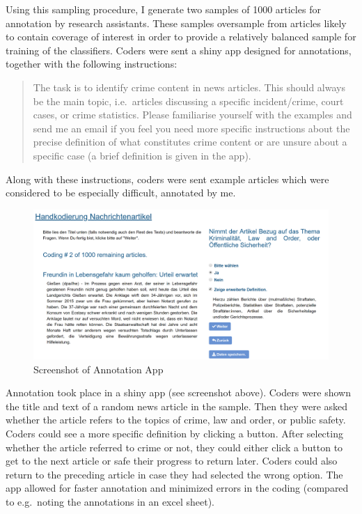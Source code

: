\documentclass[
]{article}
\begin{document}
Using this sampling procedure, I generate two samples of 1000 articles for annotation by research assistants. These samples oversample from articles likely to contain coverage of interest in order to provide a relatively balanced sample for training of the classifiers. Coders were sent a shiny app designed for annotations, together with the following instructions:

\begin{quote}
The task is to identify crime content in news articles. This should always be the main topic, i.e.~articles discussing a specific incident/crime, court cases, or crime statistics. Please familiarise yourself with the examples and send me an email if you feel you need more specific instructions about the precise definition of what constitutes crime content or are unsure about a specific case (a brief definition is given in the app).
\end{quote}

Along with these instructions, coders were sent example articles which were considered to be especially difficult, annotated by me.

\begin{figure}[!htp]

{\centering \includegraphics[width=\textwidth,]{vis/HandCodingScreenshot} 

}

\caption{Screenshot of Annotation App}\label{fig:unnamed-chunk-12}
\end{figure}

Annotation took place in a shiny app (see screenshot above). Coders were shown the title and text of a random news article in the sample. Then they were asked whether the article refers to the topics of crime, law and order, or public safety. Coders could see a more specific definition by clicking a button. After selecting whether the article referred to crime or not, they could either click a button to get to the next article or safe their progress to return later. Coders could also return to the preceding article in case they had selected the wrong option. The app allowed for faster annotation and minimized errors in the coding (compared to e.g.~noting the annotations in an excel sheet).
\end{document}
